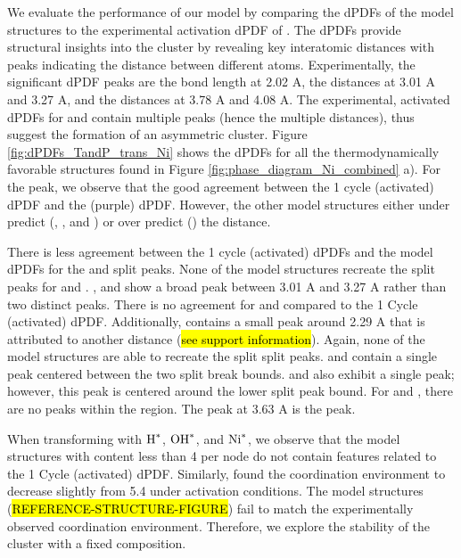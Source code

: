 \documentclass[journal=jctcce,manuscript=article]{achemso}
\begin{document}
We evaluate the performance of our model by comparing the dPDFs of the model structures to the experimental activation dPDF of \citeauthor{PlateroPrats2017}. The dPDFs provide structural insights into the cluster by revealing key interatomic distances with peaks indicating the distance between different atoms. Experimentally, the significant dPDF peaks are the  bond length at 2.02 A, the  distances at 3.01 A and 3.27 A, and the  distances at 3.78 A and 4.08 A. The experimental, activated dPDFs for  and  contain multiple peaks (hence the multiple distances), thus suggest the formation of an asymmetric cluster. Figure \ref{fig:dPDFs_TandP_trans_Ni} shows the dPDFs for all the thermodynamically favorable structures found in Figure \ref{fig:phase_diagram_Ni_combined} a). For the  peak, we observe that the good agreement between the 1 cycle (activated) dPDF and the  (purple) dPDF. However, the other model structures either under predict (, , and ) or over predict () the  distance. 

There is less agreement between the 1 cycle (activated) dPDFs and the model dPDFs for the  and  split peaks. None of the model structures recreate the split peaks for  and . ,  and  show a broad  peak between 3.01 A and 3.27 A rather than two distinct  peaks. There is no agreement for  and  compared to the 1 Cycle (activated) dPDF. Additionally,  contains a small peak around 2.29 A that is attributed to another  distance (\hl{see support information}). Again, none of the model structures are able to recreate the split  split peaks.  and 
 contain a single peak centered between the two  split break bounds.  and  also exhibit a single peak; however, this peak is centered around the lower  split peak bound. For  and , there are no peaks within the  region. The  peak at 3.63 A is the  peak. 

When transforming with $\ce{H^{*}}$, $\ce{OH^{*}}$, and $\ce{Ni^{*}}$, we observe that the model structures with  content less than 4  per node do not contain features related to the 1 Cycle (activated) dPDF. Similarly, \citeauthor{PlateroPrats2017} found the  coordination environment to decrease slightly from 5.4 under activation conditions.\cite{PlateroPrats2017} The model structures (\hl{REFERENCE-STRUCTURE-FIGURE}) fail to match the experimentally observed coordination environment. Therefore, we explore the stability of the cluster with a fixed  composition.
\end{document}
